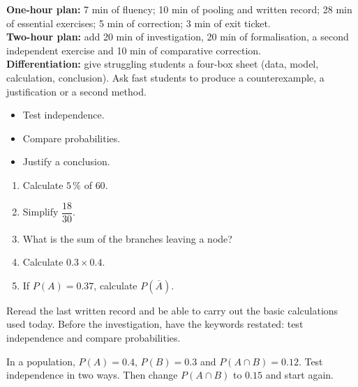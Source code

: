     \ifprof
    \begin{methode}
    \textbf{One-hour plan:} 7 min of fluency; 10 min of pooling and written record; 28 min of essential exercises; 5 min of correction; 3 min of exit ticket.\\
    \textbf{Two-hour plan:} add 20 min of investigation, 20 min of formalisation, a second independent exercise and 10 min of comparative correction.\\
    \textbf{Differentiation:} give struggling students a four-box sheet (data, model, calculation, conclusion). Ask fast students to produce a counterexample, a justification or a second method.
    \end{methode}
    \fi
{}
\begin{objectifs}\begin{itemize}\item Test independence.\item Compare probabilities.\item Justify a conclusion.\end{itemize}\end{objectifs}
\begin{automatismes}\begin{enumerate}\item Calculate $5\,\%$ of $60$. \item Simplify $\dfrac{18}{30}$. \item What is the sum of the branches leaving a node? \item Calculate $0.3\times0.4$. \item If $P(A)=0.37$, calculate $P(\overline A)$. \end{enumerate}\end{automatismes}
\begin{prerequis}Reread the last written record and be able to carry out the basic calculations used today. Before the investigation, have the keywords restated: test independence and compare probabilities.\end{prerequis}

\begin{activite}
In a population, $P(A)=0.4$, $P(B)=0.3$ and $P(A\cap B)=0.12$. Test independence in two ways. Then change $P(A\cap B)$ to $0.15$ and start again.

\end{activite}

